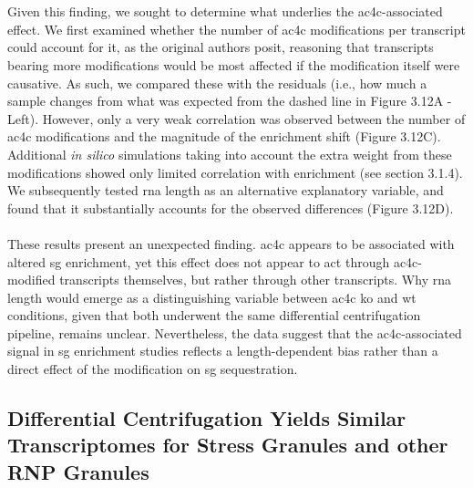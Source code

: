 \\
\\
Given this finding, we sought to determine what underlies the \gls{ac4c}-associated effect. 
We first examined whether the number of \gls{ac4c} modifications per transcript could account 
for it, as the original authors posit\cite{kudrin_n4-acetylcytidine_2024}, reasoning that 
transcripts bearing more modifications would be most affected if the modification itself were 
causative. As such, we compared these with the residuals (i.e., how much a sample changes 
from what was expected from the dashed line in Figure 3.12A - Left). However, only a very weak correlation was observed between the number of \gls{ac4c} modifications and the magnitude of the enrichment shift (Figure 3.12C). Additional \textit{in silico} simulations taking into account the extra weight from these modifications showed only limited correlation with enrichment (see section 3.1.4).  We subsequently tested \gls{rna} length as an alternative explanatory 
variable, and found that it substantially accounts for the observed differences (Figure 3.12D).
\\
\\
These results present an unexpected finding. \gls{ac4c} appears to be associated with altered \gls{sg} enrichment, yet this effect does not appear to act through \gls{ac4c}-modified transcripts themselves, but rather through other transcripts. Why \gls{rna} length would emerge as a distinguishing variable between \gls{ac4c} \gls{ko} and \gls{wt} conditions, given that both underwent the same differential centrifugation pipeline, remains unclear. Nevertheless, the data suggest that the \gls{ac4c}-associated signal in \gls{sg} enrichment studies reflects a length-dependent bias rather than a direct effect of the modification on \gls{sg} sequestration.

\subsection{Differential Centrifugation Yields Similar Transcriptomes for Stress Granules and other RNP Granules}

